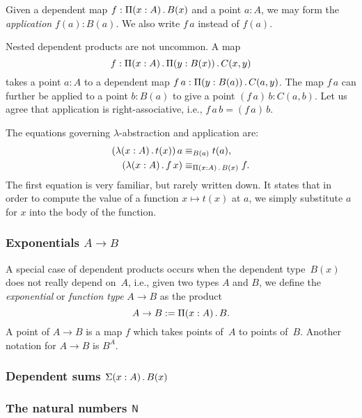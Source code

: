 \documentclass{amsart}
\begin{document}
Given a dependent map $f : \Pi(x : A) \,.\, B(x)$ and a point $a : A$, we may form
the \emph{application} $f(a) : B(a)$. We also write $f\,a$ instead of $f(a)$.

Nested dependent products are not uncommon. A map
%
\begin{equation*}
  f : \Pi(x : A) \,.\, \Pi(y : B(x)) \,.\, C(x, y)
\end{equation*}
%
takes a point $a : A$ to a dependent map $f\,a : \Pi(y : B(a)) \,.\, C(a, y)$. The
map $f\,a$ can further be applied to a point $b : B(a)$ to give a point
$(f \, a) \, b : C(a, b)$. Let us agree that application is right-associative,
i.e., $f\,a\,b = (f \, a) \, b$.

The equations governing $\lambda$-abstraction and application are:
%
\begin{align*}
  (\lambda (x : A) \,.\, t(x))\, a &\equiv_{B(a)} t(a), \\
  (\lambda (x : A) \,.\, f\,x)     &\equiv_{\Pi(x : A) \,.\, B(x)} f.
\end{align*}
%
The first equation is very familiar, but rarely written down. It states that in
order to compute the value of a function $x \mapsto t(x)$ at $a$, we simply
substitute $a$ for $x$ into the body of the function.

\subsubsection{Exponentials $A \to B$}
\label{sec:exponentials}

A special case of dependent products occurs when the dependent type~$B(x)$ does not really depend on~$A$, i.e.,
given two types $A$ and $B$, we define the \emph{exponential} or \emph{function type} $A \to B$ as the product
%
\begin{equation*}
  A \to B \mathrel{{:}{=}} \Pi(x : A) \,.\, B.
\end{equation*}
%
A point of $A \to B$ is a map $f$ which takes points of~$A$ to points of~$B$.
Another notation for $A \to B$ is $B^A$.

\subsubsection{Dependent sums $\Sigma(x : A) \,.\, B(x)$}



\subsubsection{The natural numbers $\mathsf{N}$}
\end{document}
